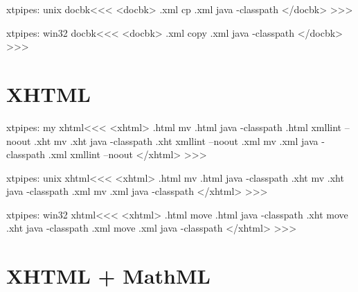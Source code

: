 \documentclass{article}
\begin{document}
\<xtpipes: unix docbk\><<<
<docbk>
.xml cp %
.xml java -classpath %
</docbk>
>>>


\<xtpipes: win32 docbk\><<<
<docbk>
.xml copy %
.xml java -classpath  %
</docbk>
>>>








\section{XHTML}

\<xtpipes: my xhtml\><<<
<xhtml>
.html mv %
.html java -classpath %
.html xmllint --noout %
.xht mv %
.xht java -classpath %
.xht xmllint --noout %
.xml mv %
.xml java -classpath %
.xml xmllint --noout %
</xhtml>
>>>


\<xtpipes: unix xhtml\><<<
<xhtml>
.html mv %
.html java -classpath  %
.xht mv %
.xht java -classpath  %
.xml mv %
.xml java -classpath  %
</xhtml>
>>>


\<xtpipes: win32 xhtml\><<<
<xhtml>
.html move %
.html java -classpath  %
.xht move %
.xht java -classpath  %
.xml move %
.xml java -classpath  %
</xhtml>
>>>



\section{XHTML + MathML}
\end{document}
